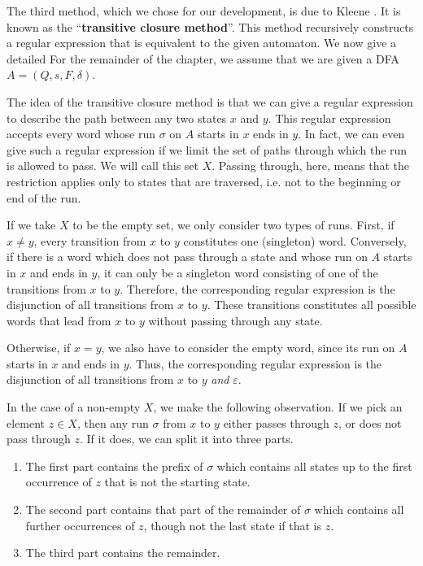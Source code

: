 The third method, which we chose for our development, is due to Kleene \cite{KleeneNets}.
It is known as the ``\textbf{transitive closure method}''.
This method recursively constructs a regular expression that is equivalent to the given automaton.
We now give a detailed 
For the remainder of the chapter, we assume that we are given a DFA $A=(Q,s,F,\delta)$.


The idea of the transitive closure method is that we can give a regular expression to describe the path between any two states $x$ and $y$.
This regular expression accepts every word whose run $\sigma$ on $A$ starts in $x$ ends in $y$.
In fact, we can even give such a regular expression if we limit the set of paths through which the run is allowed to pass. 
We will call this set $X$.
Passing through, here, means that the restriction applies only to states that are traversed, 
i.e. not to the beginning or end of the run.


If we take $X$ to be the empty set, we only consider two types of runs.
First, if $x \neq y$, every transition from $x$ to $y$ constitutes one (singleton) word. 
Conversely, if there is a word which does not pass through a state and whose run on $A$ starts in $x$ and ends in $y$, 
it can only be a singleton word consisting of one of the transitions from $x$ to $y$.
Therefore, the corresponding regular expression is the disjunction of all transitions from $x$ to $y$. 
These transitions constitutes all possible words that lead from $x$ to $y$ without passing through any state.

Otherwise, if $x = y$, we also have to consider the empty word, since its run on $A$ starts in $x$ and ends in $y$.
Thus, the corresponding regular expression is the disjunction of all transitions from $x$ to $y$ \textit{and} $\varepsilon$.


In the case of a non-empty $X$, we make the following observation. 
If we pick an element $z \in X$, then any run $\sigma$ from $x$ to $y$ either passes through $z$, or does not pass through $z$.
If it does, we can split it into three parts.
\begin{enumerate}[label=(\roman*)]
    \item  \label{R_xz}
        The first part contains the prefix of $\sigma$ which contains all states up to the first occurrence of $z$ that is not the starting state.
    \item  \label{R_zz}
        The second part contains that part of the remainder of $\sigma$ which contains all further occurrences of $z$, though not the last state if that is $z$.
    \item  \label{R_zy}
        The third part contains the remainder.
\end{enumerate}

